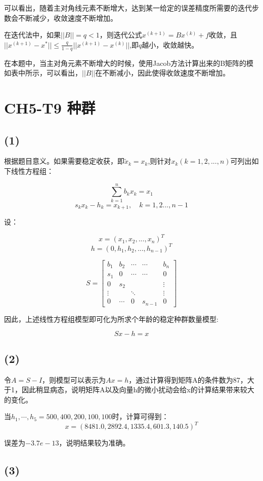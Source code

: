 \documentclass{article}
\begin{document}
可以看出，随着主对角线元素不断增大，达到某一给定的误差精度所需要的迭代步数会不断减少，收敛速度不断增加。

在迭代法中，如果$||B||=q<1$，则迭代公式$x^{(k+1)}=Bx^{(k)}+f$收敛，且$||x^{(k+1)}-x^*||\leq\frac{q}{1-q}||x^{(k+1)}-x^{(k)}||$,即$q$越小，收敛越快。

在本题中，当主对角元素不断增大的时候，使用Jacob方法计算出来的B矩阵的模如表中所示，可以看出，$||B||$在不断减小，因此使得收敛速度不断增加。

\section{CH5-T9 种群}
\subsection{(1)}
根据题目意义。如果需要稳定收获，即$\widetilde x_k=x_k$,则针对$x_k(k=1,2,...,n)$可列出如下线性方程组：


$$\sum_{k=1}^nb_kx_k = x_1 $$
$$s_kx_k-h_k = x_{k+1},\quad k=1,2...,n-1 $$


设：

$$x=(x_1,x_2,...,x_n)^T$$
$$h=(0,h_1,h_2,...,h_{n-1})^T$$

\begin{equation}
S=
\begin{bmatrix}
b_1 & b_2 & \cdots &\cdots & b_n\\
s_1 & 0 & \cdots &\cdots & 0\\
0 & s_2 &&&\vdots\\
\vdots &&\ddots&&\vdots\\
0&\cdots&0&s_{n-1}&0
\end{bmatrix}
\end{equation}

因此，上述线性方程组模型即可化为所求个年龄的稳定种群数量模型:

$$Sx-h=x$$

\subsection{(2)}
令$A = S-I$，则模型可以表示为$Ax=h$，通过计算得到矩阵A的条件数为87，大于1，因此稍显病态，说明矩阵A以及向量h的微小扰动会给x的计算结果带来较大的变化。

当$h_1,\cdots,h_5 = 500, 400, 200, 100, 100$时，计算可得到：
$$x=(8481.0, 2892.4, 1335.4, 601.3, 140.5)^T$$

误差为$-3.7e-13$，说明结果较为准确。

\subsection{(3)}
\end{document}
